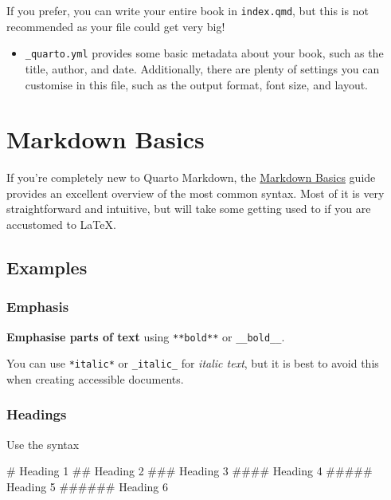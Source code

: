 \documentclass[
  letterpaper,
  oneside]{book}
\newenvironment{Shaded}{\begin{snugshade}}{\end{snugshade}}
\newcommand{\FunctionTok}[1]{\textcolor[rgb]{0.28,0.35,0.67}{#1}}
\providecommand{\tightlist}{%
  \setlength{\itemsep}{0pt}\setlength{\parskip}{0pt}}\usepackage{longtable,booktabs,array}
\numberwithin{equation}{section}
\numberwithin{figure}{section}
\theoremstyle{break}
\theoremstyle{plain}
\theoremstyle{remark}
\begin{document}
If you prefer, you can write your entire book in \texttt{index.qmd}, but
this is not recommended as your file could get very big!

\begin{itemize}
\tightlist
\item
  \texttt{\_quarto.yml} provides some basic metadata about your book,
  such as the title, author, and date. Additionally, there are plenty of
  settings you can customise in this file, such as the output format,
  font size, and layout.
\end{itemize}

\section{Markdown Basics}\label{markdown-basics}

If you're completely new to Quarto Markdown, the
\href{https://quarto.org/docs/authoring/markdown-basics.html}{Markdown
Basics} guide provides an excellent overview of the most common syntax.
Most of it is very straightforward and intuitive, but will take some
getting used to if you are accustomed to LaTeX.

\subsection{Examples}\label{examples}

\subsubsection*{Emphasis}\label{emphasis}

\textbf{Emphasise parts of text} using \texttt{**bold**} or
\texttt{\_\_bold\_\_}.

You can use \texttt{*italic*} or \texttt{\_italic\_} for \emph{italic
text}, but it is best to avoid this when creating accessible documents.

\subsubsection*{Headings}\label{headings}

Use the syntax

\begin{Shaded}
\begin{Highlighting}[]
\FunctionTok{\# Heading 1}
\FunctionTok{\#\# Heading 2}
\FunctionTok{\#\#\# Heading 3}
\FunctionTok{\#\#\#\# Heading 4}
\FunctionTok{\#\#\#\#\# Heading 5}
\FunctionTok{\#\#\#\#\#\# Heading 6}
\end{Highlighting}
\end{Shaded}
\end{document}
